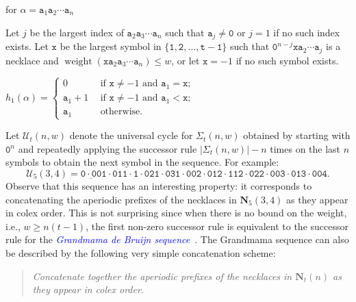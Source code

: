 \documentclass[US-letter,USenglish,authorcolumns,autoref]{lipics-v2021}
\renewcommand{\tt} {\mathtt}
\newcommand{\bN}{\mathbf{N}}
\newcommand{\defo}[1] {\emph{\textcolor{blue}{#1}}}
\newenvironment{frshaded2*}{%
    \def\FrameCommand{\fboxrule=\FrameRule\fboxsep=\FrameSep \fcolorbox{lipicsLineGray}{shadecolor}}%
    \MakeFramed {\advance\hsize-\width \FrameRestore}}%
    {\endMakeFramed}
\newenvironment{result}{
 \begin{frshaded2*}
}{%
\end{frshaded2*}

}
\DeclareMathOperator{\wt}{weight}
\begin{document}
\begin{result} 
 for $\alpha = \tt{a}_1\tt{a}_2\cdots \tt{a}_{n}$ 

\smallskip

\noindent
Let $j$ be the largest index of $\tt{a}_2\tt{a}_3\cdots \tt{a}_{n}$ such that $\tt{a}_j \ne \tt{0}$ or $j=1$ if no such index exists.
Let $\tt{x}$ be the largest symbol in $\{\tt{1,2, \ldots, t{-}1}\}$ such that $\tt{0}^{{n}-j}   \tt{x}  \tt{a}_2\cdots \tt{a}_{j}$ is a necklace and $\wt(\tt{x}\tt{a}_2\tt{a}_3\cdots \tt{a}_{{n}}) \leq w$,
or let $\tt{x}=-1$ if no such symbol exists.

\begin{center}  \small
$h_1(\alpha) = \left\{ \begin{array}{ll}
          0 		&\ \   \mbox{if  $\tt{x} \ne -1$ and $\tt{a}_1 = \tt{x}$;}\\
         \tt{a}_1{+}1	&\ \  \mbox{if  $\tt{x} \ne -1$ and $\tt{a}_1 < \tt{x}$;}   \ \ \ \ \ \ \ \ \\
         \tt{a}_1 \  	&\ \  \mbox{otherwise.}\end{array} \right.$
\end{center}

\vspace{-0.1in}
\end{result}
%
\noindent
Let $\mathcal{U}_t(n,w)$ denote the universal cycle for $\Sigma_t(n,w)$ obtained by starting with $\tt{0}^n$ and repeatedly applying the successor rule $|\Sigma_t(n,w)|-n$ times on the last $n$ symbols to obtain the next symbol in the sequence.  For example:
%
\[ \mathcal{U}_5(3,4) = \tt{\underline{0 \cdot 00}1 \cdot 011 \cdot 1 \cdot 021 \cdot 031 \cdot 002 \cdot 012 \cdot 112 \cdot 022 \cdot 003 \cdot 013 \cdot 004.} \]
Observe that this sequence has an interesting property: it corresponds to concatenating the aperiodic prefixes of the necklaces in $\bN_5(3,4)$ as they appear in colex order.  
%
This is not surprising since when there is no bound on the weight, i.e., $w \geq n(t{-}1)$, the first non-zero successor rule is equivalent to the successor rule for the \defo{Grandmama de Bruijn sequence}~\cite{grandma2}.  The Grandmama sequence can also be described by the following very simple concatenation scheme:
%
\begin{quote}
\emph{Concatenate together the aperiodic prefixes of the necklaces in $\bN_t(n)$ as they appear in colex order.} 
\end{quote}
\end{document}
